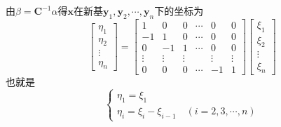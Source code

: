 \documentclass[12pt, a4paper, oneside, fontset=none]{ctexart}
\begin{document}
由$\beta = \bm{C}^{-1}\alpha$得$\bm{x}$在新基$\bm{y}_1,\bm{y}_2,\cdots,\bm{y}_n$下的坐标为
\[
    \begin{bmatrix}
        \eta_1      \\
        \eta_2      \\
        \bm{\vdots} \\
        \eta_n
    \end{bmatrix} = \begin{bmatrix}
        1           & 0           & 0           & \bm{\cdots} & 0           & 0           \\
        -1          & 1           & 0           & \bm{\cdots} & 0           & 0           \\
        0           & -1          & 1           & \bm{\cdots} & 0           & 0           \\
        \bm{\vdots} & \bm{\vdots} & \bm{\vdots} &             & \bm{\vdots} & \bm{\vdots} \\
        0           & 0           & 0           & \bm{\cdots} & -1          & 1
    \end{bmatrix} \begin{bmatrix}
        \xi_1       \\
        \xi_2       \\
        \bm{\vdots} \\
        \xi_n
    \end{bmatrix}
\]
也就是
\[
    \begin{cases}
        \eta_1 = \xi_1 \\
        \eta_i = \xi_i - \xi_{i - 1} \quad (i = 2,3,\bm{\cdots}, n)
    \end{cases}
\]
\end{document}
